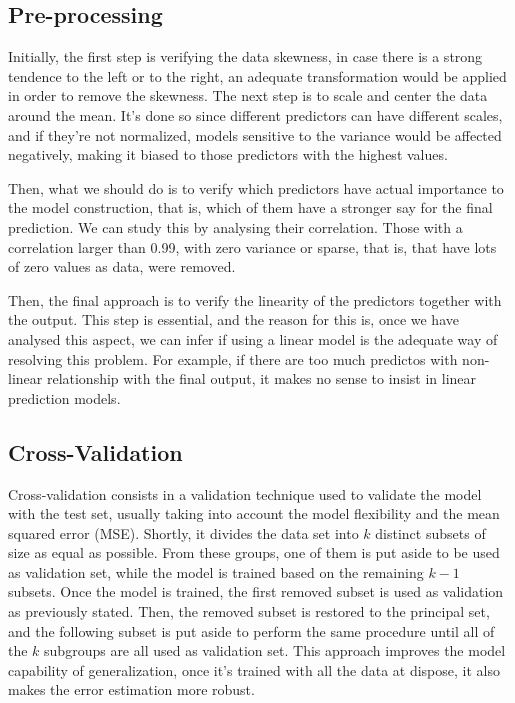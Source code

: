 \documentclass[conference]{IEEEtran}
\begin{document}
\subsection{Pre-processing}

Initially, the first step is verifying the data skewness, in case there is a strong 
tendence to the left or to the right, an adequate transformation would be applied in order to 
remove the skewness. The next step is to scale and center the data around the mean. It's 
done so since different predictors can have different scales, and if they're not normalized,
models sensitive to the variance would be affected negatively, making it biased to those
predictors with the highest values. 

Then, what we should do is to verify which predictors have actual importance to the model 
construction, that is, which of them have a stronger say for the final prediction. We can 
study this by analysing their correlation. Those with a correlation larger than 0.99, with
zero variance or sparse, that is, that have lots of zero values as data, were removed.

Then, the final approach is to verify the linearity of the predictors together with the output. 
This step is essential, and the reason for this is, once we have analysed this aspect, we can
infer if using a linear model is the adequate way of resolving this problem. For example, 
if there are too much predictos with non-linear relationship with the final output, it makes no 
sense to insist in linear prediction models.

\subsection{Cross-Validation}

Cross-validation consists in a validation technique used to validate the model with the
test set, usually taking into account the model flexibility and the mean squared error (MSE).
Shortly, it divides the data set into $k$ distinct subsets of size as equal as 
possible. From these groups, one of them is put aside to be used as validation set,
while the model is trained based on the remaining $k-1$ subsets. Once the model is trained,
the first removed subset is used as validation as previously stated. Then, the removed 
subset is restored to the principal set, and the following subset is put aside to 
perform the same procedure until all of the $k$ subgroups are all used as validation set. 
This approach improves the model capability of generalization, once it's trained with 
all the data at dispose, it also makes the error estimation more robust.
\end{document}
